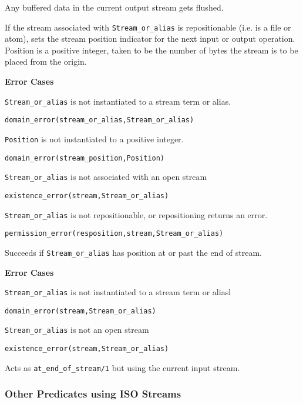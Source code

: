 \begin{description}
%
Any buffered data in the current output stream gets flushed.

%
If the stream associated with {\tt Stream\_or\_alias} is
repositionable (i.e. is a file or atom), sets the stream position
indicator for the next input or output operation. Position is a
positive integer, taken to be the number of bytes the stream is to be
placed from the origin.

{\bf Error Cases}
\bi
\item 	{\tt Stream\_or\_alias} is not instantiated to a stream term
or alias.
\bi
\item 	{\tt domain\_error(stream\_or\_alias,Stream\_or\_alias)}
\ei
\item 	{\tt Position} is not instantiated to a positive integer.
\bi
\item 	{\tt domain\_error(stream\_position,Position)}
\ei
\item 	{\tt Stream\_or\_alias} is not associated with an open stream
\bi
\item 	{\tt existence\_error(stream,Stream\_or\_alias)}
\ei
\item 	{\tt Stream\_or\_alias} is not repositionable, or
	repositioning returns an error. 
\bi
\item 	{\tt permission\_error(resposition,stream,Stream\_or\_alias)}
\ei
\ei

%
Succeeds if {\tt Stream\_or\_alias} has position at or past the end of
stream.

{\bf Error Cases}
\bi
\item 	{\tt Stream\_or\_alias} is not instantiated to a stream term
or aliasl
\bi
\item 	{\tt domain\_error(stream,Stream\_or\_alias)}
\ei
\item 	{\tt Stream\_or\_alias} is not an open stream
\bi
\item 	{\tt existence\_error(stream,Stream\_or\_alias)}
\ei
\ei
%

%
Acts as {\tt at\_end\_of\_stream/1} but using the current input
stream.

\end{description}

\subsubsection{Other Predicates using ISO Streams}

